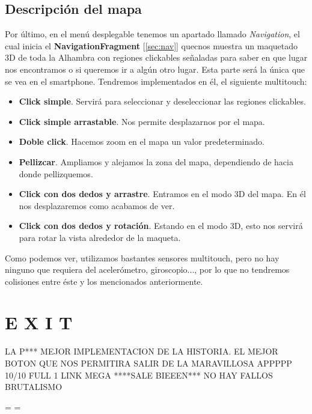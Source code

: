 \documentclass[11pt,a4paper]{article}
\begin{document}
\subsection{Descripción del mapa}
\label{sec:mapa}

Por último, en el menú desplegable tenemos un apartado llamado \textit{Navigation}, el cual inicia el \textbf{NavigationFragment} [\ref{sec:nav}]
quecnos muestra un maquetado 3D de toda la Alhambra con regiones clickables señaladas para saber en que lugar nos encontramos o si queremos
ir a algún otro lugar. Esta parte será la única que se vea en el smartphone. Tendremos implementados en él, el siguiente multitouch:

\begin{itemize}
    \item \textbf{Click simple}. Servirá para seleccionar y deseleccionar las regiones clickables.
    \item \textbf{Click simple arrastable}. Nos permite desplazarnos por el mapa.
    \item \textbf{Doble click}. Hacemos zoom en el mapa un valor predeterminado.
    \item \textbf{Pellizcar}. Ampliamos y alejamos la zona del mapa, dependiendo de hacia donde pellizquemos.
    \item \textbf{Click con dos dedos y arrastre}. Entramos en el modo 3D del mapa. En él nos desplazaremos como acabamos de ver.
    \item \textbf{Click con dos dedos y rotación}. Estando en el modo 3D, esto nos servirá para rotar la vista alrededor de la maqueta.
\end{itemize}

Como podemos ver, utilizamos bastantes sensores multitouch, pero no hay ninguno que requiera del acelerómetro, giroscopio..., por lo
que no tendremos colisiones entre éste y los mencionados anteriormente.

\section{E X I T}
LA P*** MEJOR IMPLEMENTACION DE LA HISTORIA. EL MEJOR BOTON QUE NOS PERMITIRA SALIR DE LA MARAVILLOSA APPPPP
10/10 FULL 1 LINK MEGA ****SALE BIEEEN*** NO HAY FALLOS
BRUTALISMO


%

\recalctypearea
\pdfpageheight=\paperheight
\pdfpagewidth=\paperwidth
\pagestyle{lscape}
\end{document}
